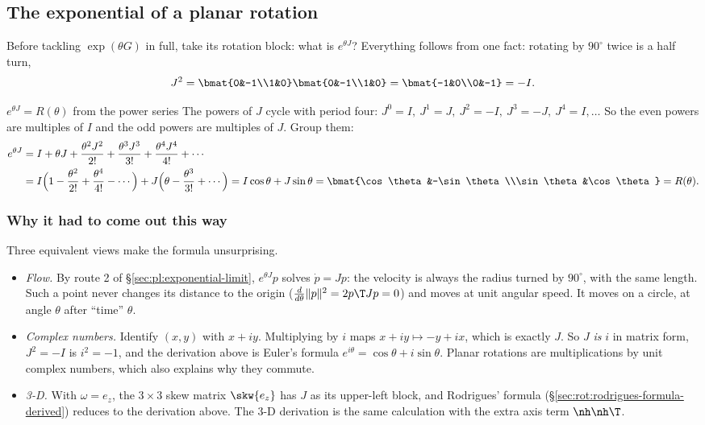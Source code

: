 \subsection{The exponential of a planar rotation}\label{sec:pl:rotation-exp}

Before tackling $\exp(\theta G)$ in full, take its rotation block: what is $e^{\theta J}$? Everything follows from one fact: rotating by $90^\circ$ twice is a half turn,
\[
J^2=\bmat{0&-1\\1&0}\bmat{0&-1\\1&0}=\bmat{-1&0\\0&-1}=-I .
\]

\begin{deriv}{$e^{\theta J}=R(\theta)$ from the power series}
The powers of $J$ cycle with period four: $J^0=I,\ J^1=J,\ J^2=-I,\ J^3=-J,\ J^4=I,\dots$ So the even powers are multiples of $I$ and the odd powers are multiples of $J$. Group them:
\begin{align*}
e^{\theta J}&=I+\theta J+\frac{\theta^2J^2}{2!}+\frac{\theta^3J^3}{3!}+\frac{\theta^4J^4}{4!}+\cdots\\
&=I\Big(1-\frac{\theta^2}{2!}+\frac{\theta^4}{4!}-\cdots\Big)+J\Big(\theta-\frac{\theta^3}{3!}+\cdots\Big)
=I\cos\theta+J\sin\theta=\bmat{\cos\theta&-\sin\theta\\\sin\theta&\cos\theta}=R(\theta).
\end{align*}
\end{deriv}

\subsubsection{Why it had to come out this way}
Three equivalent views make the formula unsurprising.
\begin{itemize}
\item \emph{Flow.} By route 2 of \S\ref{sec:pl:exponential-limit}, $e^{\theta J}p$ solves $\dot p=Jp$: the velocity is always the radius turned by $90^\circ$, with the same length. Such a point never changes its distance to the origin ($\frac{d}{d\theta}\|p\|^2=2p\T Jp=0$) and moves at unit angular speed. It moves on a circle, at angle $\theta$ after ``time'' $\theta$.
\item \emph{Complex numbers.} Identify $(x,y)$ with $x+iy$. Multiplying by $i$ maps $x+iy\mapsto -y+ix$, which is exactly $J$. So $J$ \emph{is} $i$ in matrix form, $J^2=-I$ is $i^2=-1$, and the derivation above is Euler's formula $e^{i\theta}=\cos\theta+i\sin\theta$. Planar rotations are multiplications by unit complex numbers, which also explains why they commute.
\item \emph{3-D.} With $\omega=e_z$, the $3\times3$ skew matrix $\skw{e_z}$ has $J$ as its upper-left block, and Rodrigues' formula (\S\ref{sec:rot:rodrigues-formula-derived}) reduces to the derivation above. The 3-D derivation is the same calculation with the extra axis term $\nh\nh\T$.
\end{itemize}

